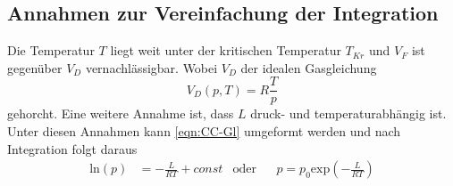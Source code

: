 
\subsection{Annahmen zur Vereinfachung der Integration} %
\label{sub:Vereinfachung}
Die Temperatur $T$ liegt weit unter der kritischen Temperatur $T_{Kr}$ und $V_F$ ist gegenüber $V_D$ vernachlässigbar.
Wobei $V_D$ der idealen Gasgleichung
\begin{equation}
    V_D(p,T) = R\frac{T}{p}\label{eqn:idGas}
\end{equation}
gehorcht.
Eine weitere Annahme ist, dass $L$ druck- und temperaturabhängig ist. 
Unter diesen Annahmen kann \autoref{eqn:CC-Gl} umgeformt werden und nach Integration folgt daraus
\begin{align}
    \text{ln}(p) &= -\frac{L}{RT}+const &\text{oder} && p=p_0 \text{exp}(-\frac{L}{RT})
    \label{eqn:CC-Gl_2}
\end{align}
 